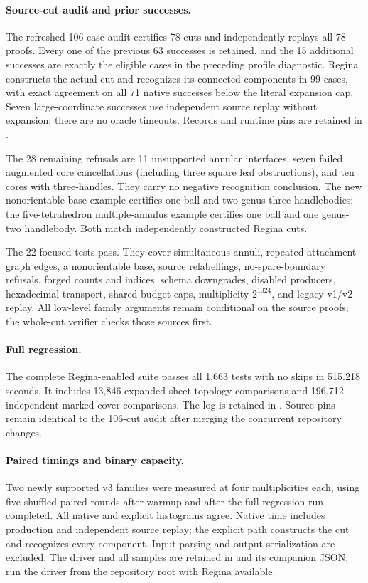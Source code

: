 \paragraph{Source-cut audit and prior successes.}
The refreshed 106-case audit certifies 78 cuts and independently replays all
78 proofs. Every one of the previous 63 successes is retained, and the 15
additional successes are exactly the eligible cases in the preceding profile
diagnostic. Regina constructs the actual cut and recognizes its connected
components in 99 cases, with exact agreement on all 71 native successes below
the literal expansion cap. Seven large-coordinate successes use independent
source replay without expansion; there are no oracle timeouts. Records and
runtime pins are retained in .

The 28 remaining refusals are 11 unsupported annular interfaces, seven failed
augmented core cancellations (including three square leaf obstructions), and
ten cores with three-handles. They carry no negative recognition conclusion.
The new nonorientable-base example certifies one ball and two genus-three
handlebodies; the five-tetrahedron multiple-annulus example certifies one ball
and one genus-two handlebody. Both match independently constructed Regina cuts.

The 22 focused tests pass. They cover simultaneous annuli, repeated attachment
graph edges, a nonorientable base, source relabellings, no-spare-boundary
refusals, forged counts and indices, schema downgrades, disabled producers,
hexadecimal transport, shared budget caps, multiplicity $2^{1024}$, and legacy
v1/v2 replay. All low-level family arguments remain conditional on the source
proofs; the whole-cut verifier checks those sources first.

\paragraph{Full regression.}
The complete Regina-enabled suite passes all 1,663 tests with no skips in
515.218 seconds. It includes 13,846 expanded-sheet topology comparisons and
196,712 independent marked-cover comparisons. The log is retained in
. Source pins remain identical to the
106-cut audit after merging the concurrent repository changes.

\paragraph{Paired timings and binary capacity.}
Two newly supported v3 families were measured at four multiplicities each,
using five shuffled paired rounds after warmup and after the full regression
run completed. All native and explicit histograms agree. Native time includes
production and independent source replay; the explicit path constructs the
cut and recognizes every component. Input parsing and output serialization
are excluded. The driver and all samples are retained in
 and its companion JSON; run the
driver from the repository root with Regina available.

